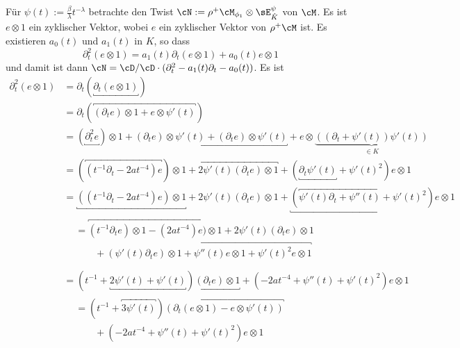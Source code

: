 \begin{try}
Für $\psi(t):=\frac{\beta}{\lambda}t^{-\lambda}$ betrachte den Twist
$\cN:=\rho^+\cM_{\phi_1}\otimes\sE_{\hat K}^\psi$ von $\cM$.  Es ist $e\otimes
1$ ein zyklischer Vektor, wobei $e$ ein zyklischer Vektor von $\rho^+\cM$ ist.
Es existieren $a_0(t)$ und $a_1(t)$ in $K$, so dass
\[
\partial_t^2 (e\otimes 1) = a_1(t)\partial_t (e\otimes 1) + a_0(t) e\otimes 1
\]
und damit ist dann $\cN=\cD/\cD\cdot(\partial_t^2-a_1(t)\partial_t-a_0(t))$.
Es ist
\begin{align*}
\partial_t^2(e\otimes 1) &= \partial_t(\underbracket{\partial_t(e\otimes 1)})
\\&= \partial_t(\overbracket{(\partial_te)\otimes 1
    + e\otimes \psi'(t)})
\\&= (\underbracket{\partial_t^2 e})\otimes 1
    + \underbracket{(\partial_t e)\otimes \psi'(t)
    +               (\partial_t e)\otimes \psi'(t)}
    + e\otimes\underset{\in K}{\underbrace{((\partial_t+\psi'(t))\psi'(t))}}
\\&= (\overbracket{(t^{-1}\partial_t - 2at^{-4}) e})\otimes 1
    + \overbracket{2\psi'(t) (\partial_t e)\otimes 1}
    + (\underbracket{\partial_t\psi'(t)} + \psi'(t)^2)e\otimes 1
\\&= \underbracket{((t^{-1}\partial_t - 2at^{-4}) e)\otimes 1}
    + 2\psi'(t) (\partial_t e)\otimes 1
    + \underbracket{(\overbracket{\psi'(t)\partial_t + \psi''(t)} +
    \psi'(t)^2)e\otimes 1}
\\&\begin{aligned}
    &= \overbracket{
        (t^{-1}\partial_t e)\otimes 1
        - (2at^{-4}) e)\otimes 1
      }
      + 2\psi'(t) (\partial_t e)\otimes 1
  \\&\qquad + \overbracket{
        (\psi'(t)\partial_t e)\otimes 1
        + \psi''(t) e\otimes 1
        + \psi'(t)^2 e\otimes 1
      }
\\\end{aligned}
\\&= (t^{-1} + \underbracket{2\psi'(t) + \psi'(t)})
    \underbracket{(\partial_t e)\otimes 1}
    + (- 2at^{-4} + \psi''(t) + \psi'(t)^2) e\otimes 1 \\&\begin{aligned} &=
    (t^{-1} + \overbracket{3\psi'(t)})\overbracket{(\partial_t (e\otimes 1) -
    e\otimes \psi'(t))}
  \\&\qquad + (- 2at^{-4} + \psi''(t) + \psi'(t)^2) e\otimes 1
\\\end{aligned}

\end{align*}
\end{try}
